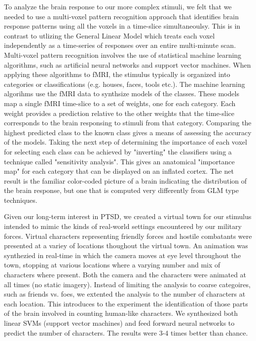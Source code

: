 \documentclass[preprint,5p,authoryear]{elsarticle}
\begin{document}
To analyze the brain response to our more complex stimuli, we felt that we needed to use a multi-voxel pattern recognition approach that identifies brain response patterns using all the voxels in a time-slice simultaneoulsy.
This is in contrast to utlizing the General Linear Model which treats each voxel independently as a time-series of responses over an entire multi-minute scan.
Multi-voxel pattern recognition \citep{Haxby2001,Mitchell2003,Haynes2006} involves the use of statistical machine learning algorithms, such as artificial neural networks and support vector machines.
When applying these algorithms to fMRI, the stimulus typically is organized into categories or classifications (e.g. houses, faces, tools etc.).
The machine learning algorihms use the fMRI data to synthsize models of the classes.
These models map a single fMRI time-slice to a set of weights, one for each category.
Each weight provides a prediction relative to the other weights that the time-slice corresponds to the brain responsing to stimuli from that category.
Comparing the highest predicted class to the known class gives a means of assessing the accuracy of the models.
Taking the next step of determining the importance of each voxel for selecting each class can be achieved by "inverting" the classifiers using a technique called "sensitivity analysis".
This gives an anatomical "importance map" for each category that can be displayed on an inflated cortex.
The net result is the familiar color-coded picture of a brain indicating the distribution of the brain response, but one that is computed very differently from GLM type techniques.

Given our long-term interest in PTSD, we created a virtual town for our stimulus intended to mimic the kinds of real-world settings encountered by our military forces.
Virtual characters representing friendly forces and hostile combatants were presented at a variey of locations thoughout the virtual town.
An animation was synthezied in real-time in which the camera moves at eye level throughout the town, stopping at various locations where a varying number and mix of characters where present.
Both the camera and the characters were animated at all times (no static imagery).
Instead of limiting the analysis to coarse categoires, such as friends vs. foes, we extented the analysis to the number of characters at each location.
This introduces to the experiment the identification of those parts of the brain involved in counting human-like characters.
We synthesized both linear SVMs (support vector machines) and feed forward neural networks to predict the number of characters.
The results were 3-4 times better than chance.
\end{document}
